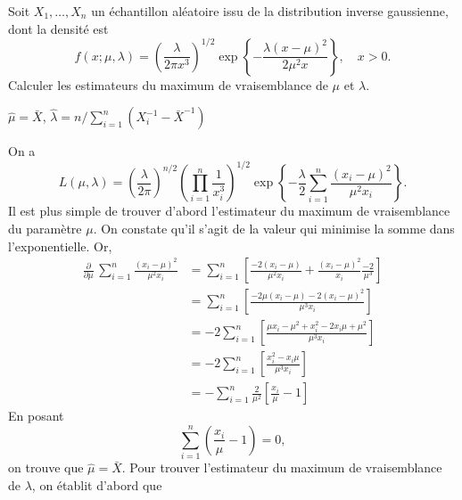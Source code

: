 \begin{exercice}
  Soit $X_1, \dots, X_n$ un échantillon aléatoire issu de la
  distribution inverse gaussienne, dont la densité est
  \begin{displaymath}
    f(x; \mu,\lambda) =
    \left(
      \frac{\lambda}{2\pi x^3}
    \right)^{1/2}
    \exp\left\{
      -\frac{\lambda (x - \mu)^2}{2\mu^2 x}
    \right\}, \quad x > 0.
  \end{displaymath}
  Calculer les estimateurs du maximum de vraisemblance de $\mu$ et $\lambda$.
  \begin{rep}
    $\hat{\mu} = \bar{X}$, $\hat{\lambda} = n/\sum_{i = 1}^n
    (X_i^{-1} - \bar{X}^{-1})$
  \end{rep}
  \begin{sol}
    On a
    \begin{equation*}
      L(\mu ,\lambda) =
      \left(
        \frac{\lambda}{2\pi}
      \right)^{n/2}
      \left(
        \prod_{i = 1}^n \frac{1}{x_i^3}
      \right)^{1/2}
      \exp\left\{
        -\frac{\lambda}{2}
        \sum_{i=1}^n \frac{(x_i - \mu)^2}{\mu^2 x_i}
      \right\}.
    \end{equation*}
    Il est plus simple de trouver d'abord l'estimateur du maximum de
    vraisemblance du paramètre $\mu$. On constate qu'il s'agit de la
    valeur qui minimise la somme dans l'exponentielle. Or,
    \begin{align*}
      \frac{\partial}{\partial \mu}\,
      \sum_{i=1}^n \frac{(x_i - \mu)^2}{\mu^2 x_i} &= \sum_{i = 1}^{n} \left[ \frac{-2 (x_i - \mu)}{\mu^2 x_i} + \frac{(x_i - \mu)^2}{x_i} \frac{-2}{\mu^3} \right] \\
      &= \sum_{i = 1}^{n} \left[ \frac{-2 \mu(x_i - \mu) - 2 (x_i - \mu)^2}{\mu^3 x_i} \right] \\
      &= -2 \sum_{i = 1}^{n} \left[\frac{\mu x_i - \mu^2 + x_i^2 - 2 x_i \mu + \mu^2}{\mu^3 x_i} \right] \\ 
      &= -2 \sum_{i = 1}^{n} \left[\frac{x_i^2 - x_i \mu}{\mu^3 x_i} \right] \\
      &= - \sum_{i = 1}^{n} \frac{2}{\mu^2} \left[ \frac{x_i}{\mu} - 1 \right]
    \end{align*}
    En posant
    \begin{equation*}
      \sum_{i=1}^n \left( \frac{x_i}{\mu} - 1 \right) = 0,
    \end{equation*}
    on trouve que $\hat{\mu} = \bar{X}$. Pour trouver l'estimateur du
    maximum de vraisemblance de $\lambda$, on établit d'abord que
    \begin{displaymath}

\end{displaymath}
\end{sol}
\end{exercice}

